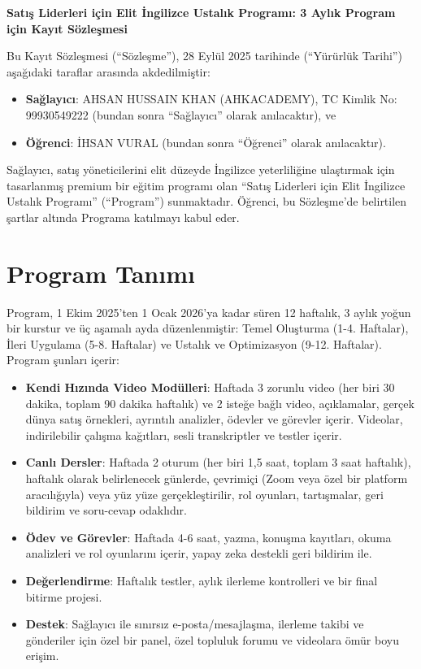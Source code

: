 \documentclass[a4paper,12pt]{article}
\begin{document}
\begin{center}
    \textbf{\Large Satış Liderleri için Elit İngilizce Ustalık Programı: 3 Aylık Program için Kayıt Sözleşmesi}
\end{center}

\vspace{0.5cm}

Bu Kayıt Sözleşmesi (``Sözleşme''), 28 Eylül 2025 tarihinde (``Yürürlük Tarihi'') aşağıdaki taraflar arasında akdedilmiştir:

\begin{itemize}[leftmargin=*]
    \item \textbf{Sağlayıcı}: AHSAN HUSSAIN KHAN (AHKACADEMY), TC Kimlik No: 99930549222 (bundan sonra ``Sağlayıcı'' olarak anılacaktır), ve
    \item \textbf{Öğrenci}: İHSAN VURAL (bundan sonra ``Öğrenci'' olarak anılacaktır).
\end{itemize}

Sağlayıcı, satış yöneticilerini elit düzeyde İngilizce yeterliliğine ulaştırmak için tasarlanmış premium bir eğitim programı olan ``Satış Liderleri için Elit İngilizce Ustalık Programı'' (``Program'') sunmaktadır. Öğrenci, bu Sözleşme'de belirtilen şartlar altında Programa katılmayı kabul eder.

\section{Program Tanımı}
Program, 1 Ekim 2025'ten 1 Ocak 2026'ya kadar süren 12 haftalık, 3 aylık yoğun bir kurstur ve üç aşamalı ayda düzenlenmiştir: Temel Oluşturma (1-4. Haftalar), İleri Uygulama (5-8. Haftalar) ve Ustalık ve Optimizasyon (9-12. Haftalar). Program şunları içerir:

\begin{itemize}[leftmargin=*]
    \item \textbf{Kendi Hızında Video Modülleri}: Haftada 3 zorunlu video (her biri 30 dakika, toplam 90 dakika haftalık) ve 2 isteğe bağlı video, açıklamalar, gerçek dünya satış örnekleri, ayrıntılı analizler, ödevler ve görevler içerir. Videolar, indirilebilir çalışma kağıtları, sesli transkriptler ve testler içerir.
    \item \textbf{Canlı Dersler}: Haftada 2 oturum (her biri 1,5 saat, toplam 3 saat haftalık), haftalık olarak belirlenecek günlerde, çevrimiçi (Zoom veya özel bir platform aracılığıyla) veya yüz yüze gerçekleştirilir, rol oyunları, tartışmalar, geri bildirim ve soru-cevap odaklıdır.
    \item \textbf{Ödev ve Görevler}: Haftada 4-6 saat, yazma, konuşma kayıtları, okuma analizleri ve rol oyunlarını içerir, yapay zeka destekli geri bildirim ile.
    \item \textbf{Değerlendirme}: Haftalık testler, aylık ilerleme kontrolleri ve bir final bitirme projesi.
    \item \textbf{Destek}: Sağlayıcı ile sınırsız e-posta/mesajlaşma, ilerleme takibi ve gönderiler için özel bir panel, özel topluluk forumu ve videolara ömür boyu erişim.
\end{itemize}
\end{document}
